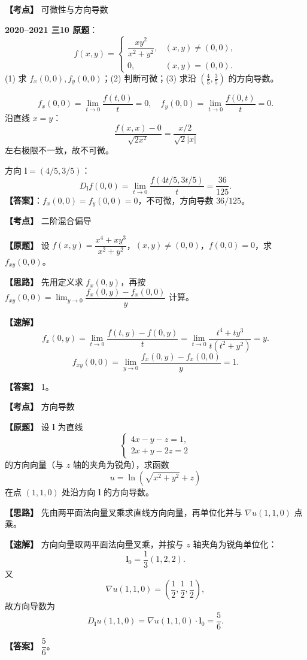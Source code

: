 ﻿\documentclass[11pt,a4paper,UTF8]{ctexart}
\begin{document}
\begin{answerbox}[2020--2021 三-10]
\textbf{【考点】} 可微性与方向导数

\textbf{2020--2021 三10 原题}：
\[
f(x,y)=\begin{cases}\dfrac{xy^2}{x^2+y^2},&(x,y)\ne(0,0),\\0,&(x,y)=(0,0).
\end{cases}
\]
(1) 求 $f_x(0,0),f_y(0,0)$；(2) 判断可微；(3) 求沿 $\left(\frac45,\frac35\right)$ 的方向导数。

\[
f_x(0,0)=\lim_{t\to0}\frac{f(t,0)}t=0,
\quad
f_y(0,0)=\lim_{t\to0}\frac{f(0,t)}t=0.
\]
沿直线 $x=y$：
\[
\frac{f(x,x)-0}{\sqrt{2x^2}}=\frac{x/2}{\sqrt2|x|}
\]
左右极限不一致，故不可微。

方向 $\boldsymbol l=(4/5,3/5)$：
\[
D_{\boldsymbol l}f(0,0)=\lim_{t\to0}\frac{f(4t/5,3t/5)}{t}
=\frac{36}{125}.
\]
\textbf{【答案】}：$f_x(0,0)=f_y(0,0)=0$，不可微，方向导数 $36/125$。

\end{answerbox}

\newpage

\begin{answerbox}[2024--2025 八]
\textbf{【考点】} 二阶混合偏导

\textbf{【原题】} 设 $f(x,y)=\dfrac{x^4+xy^3}{x^2+y^2}$，$(x,y)\ne(0,0)$，$f(0,0)=0$，求 $f_{xy}(0,0)$。

\textbf{【思路】} 先用定义求 $f_x(0,y)$，再按 $f_{xy}(0,0)=\lim_{y\to0}\dfrac{f_x(0,y)-f_x(0,0)}{y}$ 计算。

\textbf{【速解】}
\[
f_x(0,y)=\lim_{t\to0}\frac{f(t,y)-f(0,y)}{t}
=\lim_{t\to0}\frac{t^4+ty^3}{t(t^2+y^2)}=y.
\]
\[
f_{xy}(0,0)=\lim_{y\to0}\frac{f_x(0,y)-f_x(0,0)}{y}=1.
\]

\textbf{【答案】} 1。
\end{answerbox}

\begin{answerbox}[2023--2024 二-2]
\textbf{【考点】} 方向导数

\textbf{【原题】} 设 $\boldsymbol l$ 为直线
\[
\begin{cases}
4x-y-z=1,\\
2x+y-2z=2
\end{cases}
\]
的方向向量（与 $z$ 轴的夹角为锐角），求函数
\[
u=\ln\left(\sqrt{x^2+y^2}+z\right)
\]
在点 $(1,1,0)$ 处沿方向 $\boldsymbol l$ 的方向导数。

\textbf{【思路】} 先由两平面法向量叉乘求直线方向向量，再单位化并与 $\nabla u(1,1,0)$ 点乘。

\textbf{【速解】} 方向向量取两平面法向量叉乘，并按与 $z$ 轴夹角为锐角单位化：
\[
\boldsymbol l_0=\frac13(1,2,2).
\]
又
\[
\nabla u(1,1,0)=\left(\frac12,\frac12,\frac12\right),
\]
故方向导数为
\[
D_{\boldsymbol l}u(1,1,0)=\nabla u(1,1,0)\cdot\boldsymbol l_0
=\frac56.
\]

\textbf{【答案】} $\dfrac56$。
\end{answerbox}
\end{document}
